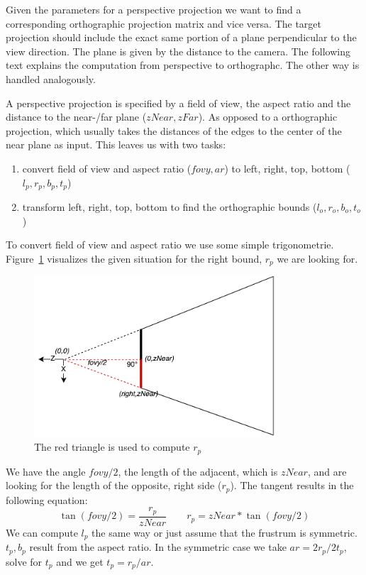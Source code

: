 \documentclass{article}
\begin{document}
Given the parameters for a perspective projection we want to find a corresponding orthographic projection matrix and vice versa. The target projection should include the exact same portion of a plane perpendicular to the view direction. The plane is given by the distance to the camera.
The following text explains the computation from perspective to orthographc. The other way is handled analogously.

A perspective projection is specified by a field of view, the aspect ratio and the distance to the near-/far plane ($zNear, zFar$). As opposed to a orthographic projection, which usually takes the distances of the edges to the center of the near plane as input.
This leaves us with two tasks:
\begin{enumerate}
  \item{convert field of view and aspect ratio ($fovy, ar$) to left, right, top, bottom ($l_p,r_p,b_p,t_p$)}
  \item{transform left, right, top, bottom to find the orthographic bounds ($l_o,r_o,b_o,t_o$)}
\end{enumerate}

To convert field of view and aspect ratio we use some simple trigonometrie. Figure~\ref{fig:fovyConversion} visualizes the given situation for the right bound, $r_p$ we are looking for.
\begin{figure}[H]
  \centering
  \label{fig:fovyConversion}
  \includegraphics[width=0.8\textwidth]{fovyConversion}
  \caption{The red triangle is used to compute $r_p$}
\end{figure}

We have the angle $fovy/2$, the length of the adjacent, which is $zNear$, and are looking for the length of the opposite, right side ($r_p$). The tangent results in the following equation:
\begin{equation}
 \tan{(fovy/2)} = \frac{r_p}{zNear}\qquad
 r_p = zNear*\tan{(fovy/2)}
\end{equation}
We can compute $l_p$ the same way or just assume that the frustrum is symmetric. $t_p, b_p$ result from the aspect ratio. In the symmetric case we take $ar=2r_p/2t_p$, solve for $t_p$ and we get $t_p=r_p/ar$.
\end{document}

